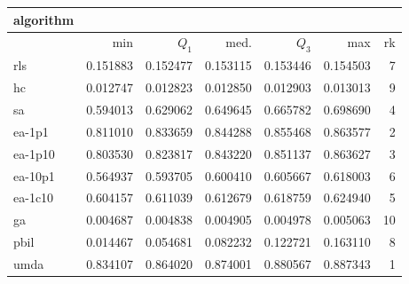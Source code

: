\begin{tabular}{@{}l*{5}{>{{}}N{1}{3}}>{{}}N{2}{0}@{}}
\toprule
{algorithm} &  \\
\midrule
& {min} & {$Q_1$} & {med.} & {$Q_3$} & {max} & {rk}\\
\midrule
rls & 0.151883 & 0.152477 & 0.153115 & 0.153446 & 0.154503 & 7\\
hc & 0.012747 & 0.012823 & 0.012850 & 0.012903 & 0.013013 & 9\\
sa & 0.594013 & 0.629062 & 0.649645 & 0.665782 & 0.698690 & 4\\
ea-1p1 & 0.811010 & 0.833659 & 0.844288 & 0.855468 & 0.863577 & 2\\
ea-1p10 & 0.803530 & 0.823817 & 0.843220 & 0.851137 & 0.863627 & 3\\
ea-10p1 & 0.564937 & 0.593705 & 0.600410 & 0.605667 & 0.618003 & 6\\
ea-1c10 & 0.604157 & 0.611039 & 0.612679 & 0.618759 & 0.624940 & 5\\
ga & 0.004687 & 0.004838 & 0.004905 & 0.004978 & 0.005063 & 10\\
pbil & 0.014467 & 0.054681 & 0.082232 & 0.122721 & 0.163110 & 8\\
umda & {\color{blue}} 0.834107 & {\color{blue}} 0.864020 & {\color{blue}} 0.874001 & {\color{blue}} 0.880567 & {\color{blue}} 0.887343 & 1\\
\bottomrule
\end{tabular}
